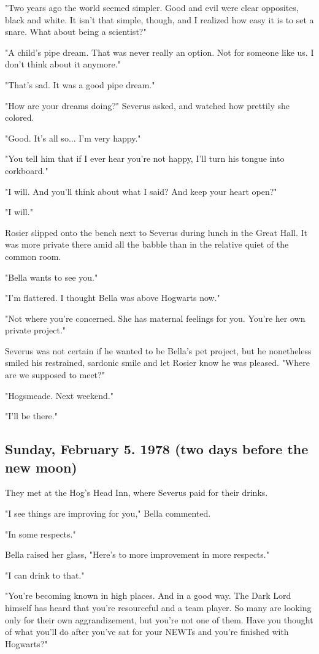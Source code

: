 "Two years ago the world seemed simpler. Good and evil were clear opposites, black and white. It isn't that simple, though, and I realized how easy it is to set a snare. What about being a scientist?"

"A child's pipe dream. That was never really an option. Not for someone like us. I don't think about it anymore."

"That's sad. It was a good pipe dream."

"How are your dreams doing?" Severus asked, and watched how prettily she colored.

"Good. It's all so... I'm very happy."

"You tell him that if I ever hear you're not happy, I'll turn his tongue into corkboard."

"I will. And you'll think about what I said? And keep your heart open?"

"I will."

Rosier slipped onto the bench next to Severus during lunch in the Great Hall. It was more private there amid all the babble than in the relative quiet of the common room.

"Bella wants to see you."

"I'm flattered. I thought Bella was above Hogwarts now."

"Not where you're concerned. She has maternal feelings for you. You're her own private project."

Severus was not certain if he wanted to be Bella's pet project, but he nonetheless smiled his restrained, sardonic smile and let Rosier know he was pleased. "Where are we supposed to meet?"

"Hogsmeade. Next weekend."

"I'll be there."

\subsection{Sunday, February 5. 1978 (two days before the new moon)}

They met at the Hog's Head Inn, where Severus paid for their drinks.

"I see things are improving for you," Bella commented.

"In some respects."

Bella raised her glass, "Here's to more improvement in more respects."

"I can drink to that."

"You're becoming known in high places. And in a good way. The Dark Lord himself has heard that you're resourceful and a team player. So many are looking only for their own aggrandizement, but you're not one of them. Have you thought of what you'll do after you've sat for your NEWTs and you're finished with Hogwarts?"

